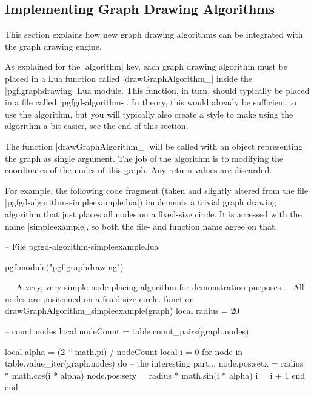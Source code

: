 \subsection{Implementing Graph Drawing Algorithms}

\label{section-gd-own-algorithm}
\label{section-library-graphdrawing-ownAlgorithm}

This section explains how new graph drawing algorithms can be
integrated with the graph drawing engine.

As explained for the |algorithm| key, each graph drawing algorithm
must be placed in a Lua function called
|drawGraphAlgorithm_| inside the
|pgf.graphdrawing| Lua module. This function, in turn, should
typically be placed in a file called |pgfgd-algorithm-|. In theory, this would already be sufficient to use the
algorithm, but you will typically also create a style to make using
the algorithm a bit easier, see the end of this section.

The function |drawGraphAlgorithm_| will be called
with an object representing the graph as single argument. The job of
the algorithm is to modifying the coordinates of the nodes of this
graph. Any return values are discarded. 

For example, the following code fragment (taken and slightly altered
from the file |pgfgd-algorithm-simpleexample.lua|)
implements a trivial graph drawing algorithm that just places all
nodes on a fixed-size circle.  It is accessed with the name
|simpleexample|, so both the file- and function name agree on that.

\begin{codeexample}
-- File pgfgd-algorithm-simpleexample.lua
  
pgf.module("pgf.graphdrawing")

--- A very, very simple node placing algorithm for demonstration purposes.
-- All nodes are positioned on a fixed-size circle.
function drawGraphAlgorithm_simpleexample(graph)
   local radius = 20

   -- count nodes
   local nodeCount = table.count_pairs(graph.nodes)

   local alpha = (2 * math.pi) / nodeCount
   local i = 0
   for node in table.value_iter(graph.nodes) do
      -- the interesting part...
      node.pos:set{x = radius * math.cos(i * alpha)}
      node.pos:set{y = radius * math.sin(i * alpha)}
      i = i + 1
   end
end
\end{codeexample}

